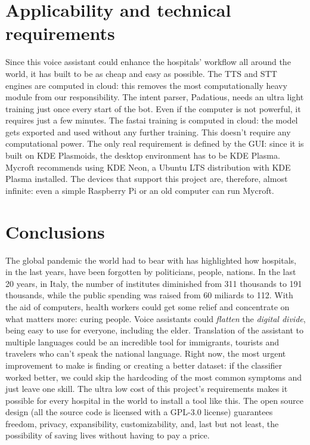 \documentclass[conference]{IEEEtran}
\begin{document}
\section{Applicability and technical requirements}
\label{sec:applicability}
Since this voice assistant could enhance the hospitals' workflow all around the world, it has built to be as cheap and easy as possible. The TTS and STT engines are computed in cloud: this removes the most computationally heavy module from our responsibility. The intent parser, Padatious, needs an ultra light training just once every start of the bot. Even if the computer is not powerful, it requires just a few minutes. The fastai training is computed in cloud: the model gets exported and used without any further training. This doesn't require any computational power. The only real requirement is defined by the GUI: since it is built on KDE Plasmoids, the desktop environment has to be KDE Plasma. Mycroft recommends using KDE Neon, a Ubuntu LTS distribution with KDE Plasma installed. The devices that support this project are, therefore, almost infinite: even a simple Raspberry Pi or an old computer can run Mycroft.
\section{Conclusions}
\label{sec:conclusions}
The global pandemic the world had to bear with has highlighted how hospitals, in the last years, have been forgotten by politicians, people, nations. In the last 20 years, in Italy, the number of institutes diminished from 311 thousands to 191 thousands, while the public spending was raised from 60 miliards to 112\cite{b4}. With the aid of computers, health workers could get some relief and concentrate on what matters more: curing people. Voice assistants could \textit{flatten} the
\textit{digital divide}, being easy to use for everyone, including the elder. Translation of the assistant to multiple languages could be an incredible tool for immigrants, tourists and travelers who can't speak the national language. Right now, the most urgent improvement to make is finding or creating a better dataset: if the classifier worked better, we could skip the hardcoding of the most common symptoms and just leave one skill. The ultra low cost of this project's requirements makes it possible for every hospital in the world to install a tool like this. The open source design (all the source code is licensed with a GPL-3.0 license) guarantees freedom, privacy, expansibility, customizability, and, last but not least, the possibility of saving lives without having to pay a price.
\end{document}
